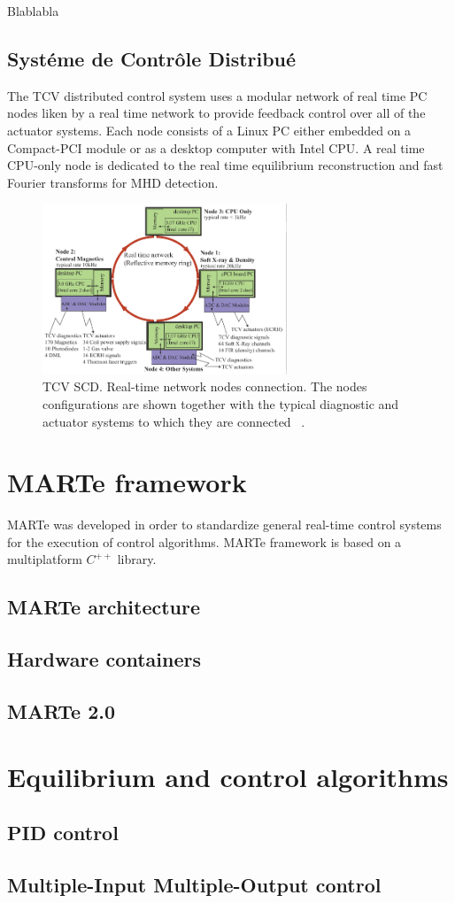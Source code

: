 Blablabla 

\subsection{Syst\'eme de Contr\^ole Distribu\'e}

The TCV distributed control system uses a modular network of real time PC nodes liken by a real time network to provide feedback control over all of the actuator systems. Each node consists of a Linux PC either embedded on a Compact-PCI module or as a desktop computer with Intel CPU. A real time CPU-only node is dedicated to the real time equilibrium reconstruction and fast Fourier transforms for MHD detection.  \cite{TCVcntrl}

\begin{figure}[htbp]
	\centering
	\includegraphics[width=0.65\textwidth]{Chp2/TCVcntrl.png}
	\caption{\label{TCVcontrol} TCV SCD. Real-time network nodes connection. The nodes configurations
		are shown together with the typical diagnostic and actuator systems to which they are connected  ~\cite{TCVcntrl}.  }
\end{figure}

\section{MARTe framework}

MARTe was developed in order to standardize general real-time control systems for the execution of control algorithms. MARTe framework is based on a multiplatform $C^{++}$ library. \cite{Neto2011} 

\subsection{MARTe architecture }
\subsection{Hardware containers}
\subsection{MARTe 2.0}
\section{Equilibrium and control algorithms} 
\subsection{PID control}
\subsection{Multiple-Input Multiple-Output control}